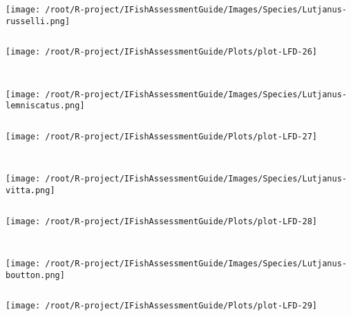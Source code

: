 \begin{knitrout}
\begin{kframe}
\begin{verbatim}
\end{verbatim}
\end{kframe}
\texttt{[image: /root/R-project/IFishAssessmentGuide/Images/Species/Lutjanus-russelli.png]}
\begin{kframe}\begin{verbatim}
\end{verbatim}
\end{kframe}
\texttt{[image: /root/R-project/IFishAssessmentGuide/Plots/plot-LFD-26]} 
\begin{kframe}\begin{verbatim}
 
\end{verbatim}
\end{kframe}
\texttt{[image: /root/R-project/IFishAssessmentGuide/Images/Species/Lutjanus-lemniscatus.png]}
\begin{kframe}\begin{verbatim}
\end{verbatim}
\end{kframe}
\texttt{[image: /root/R-project/IFishAssessmentGuide/Plots/plot-LFD-27]} 
\begin{kframe}\begin{verbatim}
 
\end{verbatim}
\end{kframe}
\texttt{[image: /root/R-project/IFishAssessmentGuide/Images/Species/Lutjanus-vitta.png]}
\begin{kframe}\begin{verbatim}
\end{verbatim}
\end{kframe}
\texttt{[image: /root/R-project/IFishAssessmentGuide/Plots/plot-LFD-28]} 
\begin{kframe}\begin{verbatim}
 
\end{verbatim}
\end{kframe}
\texttt{[image: /root/R-project/IFishAssessmentGuide/Images/Species/Lutjanus-boutton.png]}
\begin{kframe}\begin{verbatim}
\end{verbatim}
\end{kframe}
\texttt{[image: /root/R-project/IFishAssessmentGuide/Plots/plot-LFD-29]} 
\begin{kframe}\begin{verbatim}
 

\end{verbatim}
\end{kframe}
\end{knitrout}
